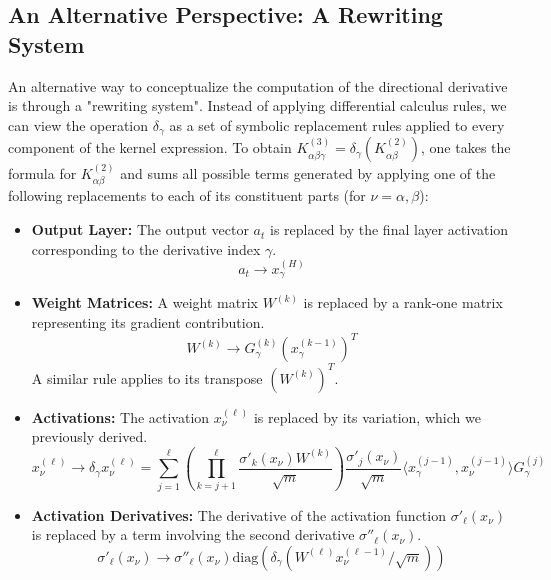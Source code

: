 \documentclass[11pt,a4paper]{article}
\theoremstyle{definition}
\begin{document}
\subsection{An Alternative Perspective: A Rewriting System}

An alternative way to conceptualize the computation of the directional derivative is through a "rewriting system". Instead of applying differential calculus rules, we can view the operation $\delta_\gamma$ as a set of symbolic replacement rules applied to every component of the kernel expression. To obtain $K^{(3)}_{\alpha\beta\gamma} = \delta_\gamma(K^{(2)}_{\alpha\beta})$, one takes the formula for $K^{(2)}_{\alpha\beta}$ and sums all possible terms generated by applying one of the following replacements to each of its constituent parts (for $\nu = \alpha, \beta$):

\begin{itemize}
    \item \textbf{Output Layer:} The output vector $a_t$ is replaced by the final layer activation corresponding to the derivative index $\gamma$.
    \begin{equation}
    a_t \rightarrow x^{(H)}_\gamma
    \end{equation}
    \item \textbf{Weight Matrices:} A weight matrix $W^{(k)}$ is replaced by a rank-one matrix representing its gradient contribution.
    \begin{equation}
    W^{(k)} \rightarrow G^{(k)}_\gamma (x^{(k-1)}_\gamma)^T
    \end{equation}
    A similar rule applies to its transpose $(W^{(k)})^T$.
    \item \textbf{Activations:} The activation $x^{(\ell)}_\nu$ is replaced by its variation, which we previously derived.
    \begin{equation}
    x^{(\ell)}_\nu \rightarrow \delta_\gamma x^{(\ell)}_\nu = \sum_{j=1}^{\ell} \left( \prod_{k=j+1}^{\ell} \frac{\sigma'_{k}(x_\nu) W^{(k)}}{\sqrt{m}} \right) \frac{\sigma'_{j}(x_\nu)}{\sqrt{m}} \langle x^{(j-1)}_\gamma, x^{(j-1)}_\nu \rangle G^{(j)}_\gamma
    \end{equation}
    \item \textbf{Activation Derivatives:} The derivative of the activation function $\sigma'_\ell(x_\nu)$ is replaced by a term involving the second derivative $\sigma''_\ell(x_\nu)$.
    \begin{equation}
    \sigma'_\ell(x_\nu) \rightarrow \sigma''_\ell(x_\nu) \text{diag}(\delta_\gamma(W^{(\ell)}x^{(\ell-1)}_\nu/\sqrt{m}))
    \end{equation}
\end{itemize}
\end{document}
